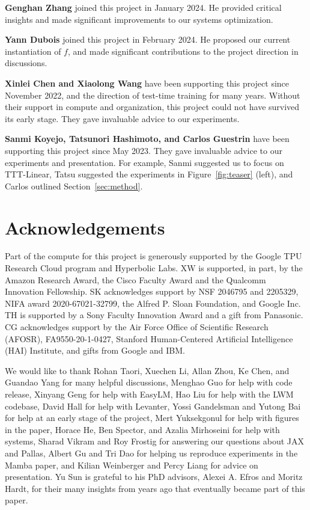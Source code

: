 \documentclass{article}
\begin{document}
\textbf{Genghan Zhang} joined this project in January 2024. He provided critical insights and made significant improvements to our systems optimization.

\textbf{Yann Dubois} joined this project in February 2024. He proposed our current instantiation of $f$, and made significant contributions to the project direction in discussions.

\textbf{Xinlei Chen and Xiaolong Wang} have been supporting this project since November 2022, and the direction of test-time training for many years. Without their support in compute and organization, this project could not have survived its early stage.
They gave invaluable advice to our experiments.

\textbf{Sanmi Koyejo, Tatsunori Hashimoto, and Carlos Guestrin} have been supporting this project since May 2023. They gave invaluable advice to our experiments and presentation.
For example, Sanmi suggested us to focus on TTT-Linear,
Tatsu suggested the experiments in Figure~\ref{fig:teaser} (left), and Carlos outlined Section~\ref{sec:method}.

\section*{Acknowledgements}
Part of the compute for this project is generously supported by the Google TPU Research Cloud program and Hyperbolic Labs.
XW is supported, in part, by the Amazon Research Award, the Cisco Faculty Award and the Qualcomm Innovation Fellowship.
SK acknowledges support by NSF 2046795 and 2205329, NIFA award 2020-67021-32799, the Alfred P. Sloan Foundation, and Google Inc.
TH is supported by a Sony Faculty Innovation Award and a gift from Panasonic.
CG acknowledges support by the Air Force Office of Scientific Research (AFOSR), FA9550-20-1-0427, Stanford Human-Centered Artificial Intelligence (HAI) Institute, and gifts from Google and IBM.

We would like to thank Rohan Taori, Xuechen Li, Allan Zhou, Ke Chen, and Guandao Yang for many helpful discussions,
Menghao Guo for help with code release,
Xinyang Geng for help with EasyLM,
Hao Liu for help with the LWM codebase,
David Hall for help with Levanter,
Yossi Gandelsman and Yutong Bai for help at an early stage of the project,
Mert Yuksekgonul for help with figures in the paper,
Horace He, Ben Spector, and Azalia Mirhoseini for help with systems,
Sharad Vikram and Roy Frostig for answering our questions about JAX and Pallas, 
Albert Gu and Tri Dao for helping us reproduce experiments in the Mamba paper,
and Kilian Weinberger and Percy Liang for advice on presentation.
Yu Sun is grateful to his PhD advisors,
Alexei A. Efros and Moritz Hardt, for their many insights from years ago that eventually became part of this paper.
\end{document}
